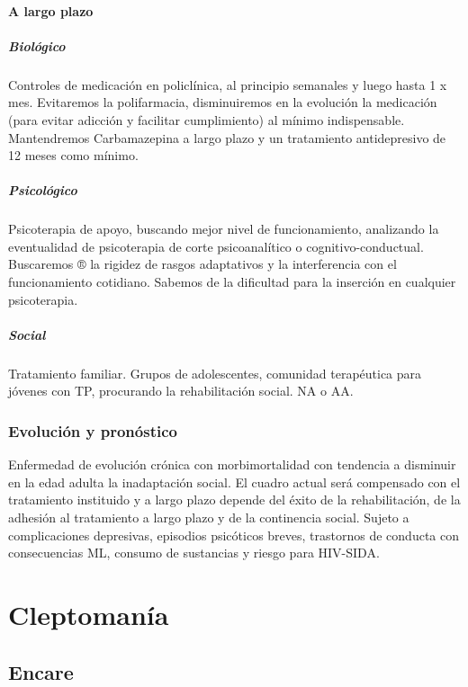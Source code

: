 \documentclass{scrbook}
\begin{document}
\subsubsection*{A largo plazo}
\paragraph{Biológico}
Controles de medicación en policlínica, al principio semanales y luego hasta 1 x mes. Evitaremos la polifarmacia, disminuiremos en la evolución la medicación (para evitar adicción y facilitar cumplimiento) al mínimo indispensable. Mantendremos Carbamazepina a largo plazo y un tratamiento antidepresivo de 12 meses como mínimo.
\paragraph{Psicológico}
Psicoterapia de apoyo, buscando mejor nivel de funcionamiento, analizando la eventualidad de psicoterapia de corte psicoanalítico o cognitivo-conductual. Buscaremos ® la rigidez de rasgos adaptativos y la interferencia con el funcionamiento cotidiano. Sabemos de la dificultad para la inserción en cualquier psicoterapia.
\paragraph{Social}
Tratamiento familiar. Grupos de adolescentes, comunidad terapéutica para jóvenes con TP, procurando la rehabilitación social. NA o AA.
\subsection*{Evolución y pronóstico}
Enfermedad de evolución crónica con morbimortalidad con tendencia a disminuir en la edad adulta la inadaptación social. El cuadro actual será compensado con el tratamiento instituido y a largo plazo depende del éxito de la rehabilitación, de la adhesión al tratamiento a largo plazo y de la continencia social. Sujeto a complicaciones depresivas, episodios psicóticos breves, trastornos de conducta con consecuencias ML, consumo de sustancias y riesgo para HIV-SIDA.
\printbibliography

\chapter{Cleptomanía}
\section*{Encare}
\end{document}
